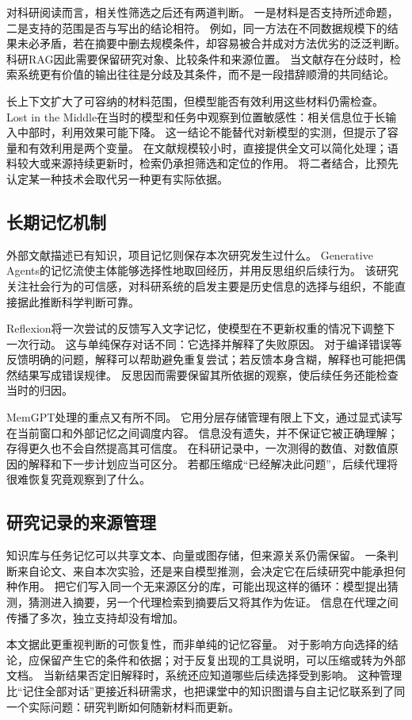 对科研阅读而言，相关性筛选之后还有两道判断。
一是材料是否支持所述命题，二是支持的范围是否与写出的结论相符。
例如，同一方法在不同数据规模下的结果未必矛盾，若在摘要中删去规模条件，却容易被合并成对方法优劣的泛泛判断。
科研RAG因此需要保留研究对象、比较条件和来源位置。
当文献存在分歧时，检索系统更有价值的输出往往是分歧及其条件，而不是一段措辞顺滑的共同结论。

长上下文扩大了可容纳的材料范围，但模型能否有效利用这些材料仍需检查。
Lost in the Middle在当时的模型和任务中观察到位置敏感性：相关信息位于长输入中部时，利用效果可能下降\cite{middle}。
这一结论不能替代对新模型的实测，但提示了容量和有效利用是两个变量。
在文献规模较小时，直接提供全文可以简化处理；语料较大或来源持续更新时，检索仍承担筛选和定位的作用。
将二者结合，比预先认定某一种技术会取代另一种更有实际依据。

\subsection{长期记忆机制}
外部文献描述已有知识，项目记忆则保存本次研究发生过什么。
Generative Agents的记忆流使主体能够选择性地取回经历，并用反思组织后续行为\cite{generative}。
该研究关注社会行为的可信感，对科研系统的启发主要是历史信息的选择与组织，不能直接据此推断科学判断可靠。

Reflexion将一次尝试的反馈写入文字记忆，使模型在不更新权重的情况下调整下一次行动\cite{reflexion}。
这与单纯保存对话不同：它选择并解释了失败原因。
对于编译错误等反馈明确的问题，解释可以帮助避免重复尝试；若反馈本身含糊，解释也可能把偶然结果写成错误规律。
反思因而需要保留其所依据的观察，使后续任务还能检查当时的归因。

MemGPT处理的重点又有所不同。
它用分层存储管理有限上下文，通过显式读写在当前窗口和外部记忆之间调度内容\cite{memgpt}。
信息没有遗失，并不保证它被正确理解；存得更久也不会自然提高其可信度。
在科研记录中，一次测得的数值、对数值原因的解释和下一步计划应当可区分。
若都压缩成“已经解决此问题”，后续代理将很难恢复究竟观察到了什么。

\subsection{研究记录的来源管理}
知识库与任务记忆可以共享文本、向量或图存储，但来源关系仍需保留。
一条判断来自论文、来自本次实验，还是来自模型推测，会决定它在后续研究中能承担何种作用。
把它们写入同一个无来源区分的库，可能出现这样的循环：模型提出猜测，猜测进入摘要，另一个代理检索到摘要后又将其作为佐证。
信息在代理之间传播了多次，独立支持却没有增加。

本文据此更重视判断的可恢复性，而非单纯的记忆容量。
对于影响方向选择的结论，应保留产生它的条件和依据；对于反复出现的工具说明，可以压缩或转为外部文档。
当新结果否定旧解释时，系统还应知道哪些后续选择受到影响。
这种管理比“记住全部对话”更接近科研需求，也把课堂中的知识图谱与自主记忆联系到了同一个实际问题：研究判断如何随新材料而更新。

